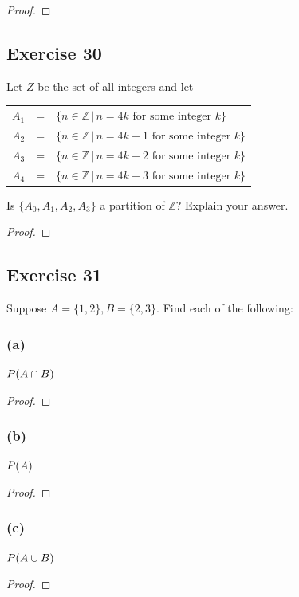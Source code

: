 \documentclass[14pt]{extarticle}
\let\mathscr\relax
\newcommand{\ps}{\mathscr{P}}
\newcommand{\Z}{\mathbb{Z}}
\begin{document}
\begin{proof}

\end{proof}

\subsection{Exercise 30}
Let $Z$ be the set of all integers and let
\begin{center}
\begin{tabular}{rcl}
$A_1$ & = & \(\{n \in \Z \, | \, n = 4k \text{ for some integer } k\}\) \\
$A_2$ & = & \(\{n \in \Z \, | \, n = 4k + 1 \text{ for some integer } k\}\) \\
$A_3$ & = & \(\{n \in \Z \, | \, n = 4k + 2 \text{ for some integer } k\}\) \\
$A_4$ & = & \(\{n \in \Z \, | \, n = 4k + 3 \text{ for some integer } k\}\) 
\end{tabular}
\end{center}
Is \(\{A_0, A_1, A_2, A_3\}\) a partition of $\Z$? Explain your answer.

\begin{proof}

\end{proof}

\subsection{Exercise 31}
Suppose \(A = \{1, 2\}, B = \{2, 3\}\). Find each of the following:

\subsubsection{(a)}
\(\ps(A \cap B)\)

\begin{proof}

\end{proof}

\subsubsection{(b)}
\(\ps(A)\)

\begin{proof}

\end{proof}

\subsubsection{(c)}
\(\ps(A \cup B)\)
\begin{proof}

\end{proof}
\end{document}
